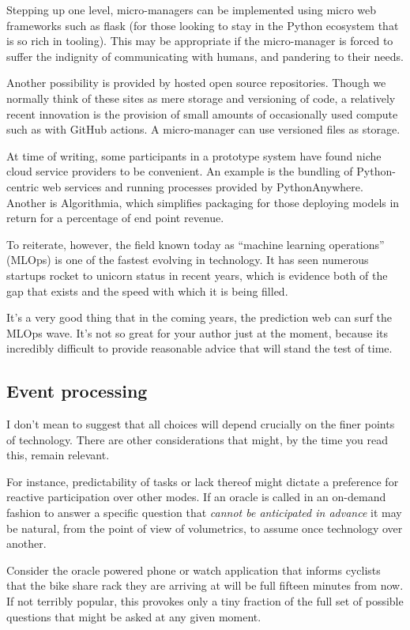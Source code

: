 Stepping up one level, micro-managers can be implemented using micro web frameworks such as flask (for those looking to stay in the Python ecosystem that is so rich in tooling). This may be appropriate if the micro-manager is forced to suffer the indignity of communicating with humans, and pandering to their needs. 


Another possibility is provided by hosted open source repositories. Though we normally think of these sites as mere storage and versioning of code, a relatively recent innovation is the provision of small amounts of occasionally used compute such as with GitHub actions. A micro-manager can use versioned files as storage. 


At time of writing, some participants in a prototype system have found niche cloud service providers to be convenient. An example is the bundling of Python-centric web services and running processes provided by PythonAnywhere. Another is Algorithmia, which simplifies packaging for those deploying models in return for a percentage of end point revenue. 


To reiterate, however, the field known today as ``machine learning operations'' (MLOps) is one of the fastest evolving in technology. It has seen numerous startups rocket to unicorn status in recent years, which is evidence both of the gap that exists and the speed with which it is being filled. 


It's a very good thing that in the coming years, the prediction web can surf the MLOps wave. It's not so great for your author just at the moment, because its incredibly difficult to provide reasonable advice that will stand the test of time. 


\subsection{Event processing}

I don't mean to suggest that all choices will depend crucially on the finer points of technology. There are other considerations that might, by the time you read this, remain relevant. 


For instance, predictability of tasks or lack thereof might dictate a preference for reactive participation over other modes. If an oracle is called in an on-demand fashion to answer a specific question that {\em cannot be anticipated in advance} it may be natural, from the point of view of volumetrics, to assume once technology over another. 


Consider the oracle powered phone or watch application that informs cyclists that the bike share rack they are arriving at will be full fifteen minutes from now. If not terribly popular, this provokes only a tiny fraction of the full set of possible questions that might be asked at any given moment. 



